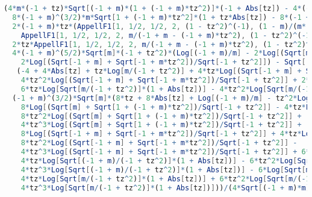 \begin{lstlisting}[breaklines=true, caption={Expression for Type-II intraband transition with \( t_z < - 1 \), given in Mathematica format.\label{lst:typeii-intraband-tzneg}},language=Mathematica]
(4*m*(-1 + tz)*Sqrt[(-1 + m)*(1 + (-1 + m)*tz^2)]*(-1 + Abs[tz]) - 4*(-1 + m)*(-1 + tz)*Sqrt[m*(-1 + m*tz^2)]*(-1 + Abs[tz]) +
  8*(-1 + m)^(3/2)*m*Sqrt[1 + (-1 + m)*tz^2]*(1 + tz*Abs[tz]) - 8*(-1 + m)^2*Sqrt[m*(-1 + m*tz^2)]*(1 + tz*Abs[tz]) +
  2*(-1 + m)*tz*(AppellF1[1, 1/2, 1/2, 2, (1 - tz^2)^(-1), (1 - m)/(m*(-1 + tz^2))] -
    AppellF1[1, 1/2, 1/2, 2, m/(-1 + m - (-1 + m)*tz^2), (1 - tz^2)^(-1)]) -
  2*tz*AppellF1[1, 1/2, 1/2, 2, m/(-1 + m - (-1 + m)*tz^2), (1 - tz^2)^(-1)] -
  4*(-1 + m)^(5/2)*Sqrt[m]*(-1 + tz^2)*(Log[(-1 + m)/m] - 2*Log[(Sqrt[m] + Sqrt[1 + (-1 + m)*tz^2])/Sqrt[-1 + tz^2]] +
    2*Log[(Sqrt[-1 + m] + Sqrt[-1 + m*tz^2])/Sqrt[-1 + tz^2]]) - Sqrt[(-1 + m)*m]*(-1 + tz)*
   (-4 + 4*Abs[tz] + tz*Log[m/(-1 + tz^2)] + 4*tz*Log[(Sqrt[-1 + m] + Sqrt[-1 + m*tz^2])/Sqrt[-1 + tz^2]] +
    4*tz^2*Log[(Sqrt[-1 + m] + Sqrt[-1 + m*tz^2])/Sqrt[-1 + tz^2]] + 2*tz*Log[1 + Abs[tz]] -
    6*tz*Log[Sqrt[m/(-1 + tz^2)]*(1 + Abs[tz])] - 4*tz^2*Log[Sqrt[m/(-1 + tz^2)]*(1 + Abs[tz])]) +
  (-1 + m)^(3/2)*Sqrt[m]*(8*tz + 8*Abs[tz] + Log[(-1 + m)/m] - tz^2*Log[(-1 + m)/(-1 + tz^2)] + tz^2*Log[m/(-1 + tz^2)] -
    8*Log[(Sqrt[m] + Sqrt[1 + (-1 + m)*tz^2])/Sqrt[-1 + tz^2]] - 4*tz*Log[(Sqrt[m] + Sqrt[1 + (-1 + m)*tz^2])/Sqrt[-1 + tz^2]] +
    8*tz^2*Log[(Sqrt[m] + Sqrt[1 + (-1 + m)*tz^2])/Sqrt[-1 + tz^2]] +
    4*tz^3*Log[(Sqrt[m] + Sqrt[1 + (-1 + m)*tz^2])/Sqrt[-1 + tz^2]] +
    8*Log[(Sqrt[-1 + m] + Sqrt[-1 + m*tz^2])/Sqrt[-1 + tz^2]] + 4*tz*Log[(Sqrt[-1 + m] + Sqrt[-1 + m*tz^2])/Sqrt[-1 + tz^2]] -
    8*tz^2*Log[(Sqrt[-1 + m] + Sqrt[-1 + m*tz^2])/Sqrt[-1 + tz^2]] -
    4*tz^3*Log[(Sqrt[-1 + m] + Sqrt[-1 + m*tz^2])/Sqrt[-1 + tz^2]] + 6*Log[Sqrt[(-1 + m)/(-1 + tz^2)]*(1 + Abs[tz])] +
    4*tz*Log[Sqrt[(-1 + m)/(-1 + tz^2)]*(1 + Abs[tz])] - 6*tz^2*Log[Sqrt[(-1 + m)/(-1 + tz^2)]*(1 + Abs[tz])] -
    4*tz^3*Log[Sqrt[(-1 + m)/(-1 + tz^2)]*(1 + Abs[tz])] - 6*Log[Sqrt[m/(-1 + tz^2)]*(1 + Abs[tz])] -
    4*tz*Log[Sqrt[m/(-1 + tz^2)]*(1 + Abs[tz])] + 6*tz^2*Log[Sqrt[m/(-1 + tz^2)]*(1 + Abs[tz])] +
    4*tz^3*Log[Sqrt[m/(-1 + tz^2)]*(1 + Abs[tz])]))/(4*Sqrt[(-1 + m)*m]*(-1 + tz^2))
\end{lstlisting}


